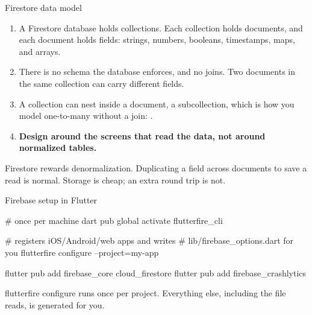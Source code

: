 \documentclass[10pt,aspectratio=169,t]{beamer}
\begin{document}
\begin{frame}[eyebrow=Firebase]{Firestore data model}
  \vskip 2mm
  \begin{enumerate}
    \item A Firestore database holds collections. Each collection holds documents, and each document holds fields: strings, numbers, booleans, timestamps, maps, and arrays.
    \item There is no schema the database enforces, and no joins. Two documents in the same collection can carry different fields.
    \item A collection can nest inside a document, a subcollection, which is how you model one-to-many without a join: .
    \item \textbf{Design around the screens that read the data, not around normalized tables.}
  \end{enumerate}
  \begin{takeaway}{Firestore rewards denormalization.}
    Duplicating a field across documents to save a read is normal. Storage is cheap; an extra round trip is not.
  \end{takeaway}
\end{frame}

\begin{frame}[fragile,eyebrow=Firebase]{Firebase setup in Flutter}
\begin{shell}
# once per machine
dart pub global activate flutterfire_cli

# registers iOS/Android/web apps and writes
# lib/firebase_options.dart for you
flutterfire configure --project=my-app

flutter pub add firebase_core cloud_firestore
flutter pub add firebase_crashlytics
\end{shell}
  \begin{takeaway}{flutterfire configure runs once per project.}
    Everything else, including the file  reads, is generated for you.
  \end{takeaway}
\end{frame}
\end{document}

